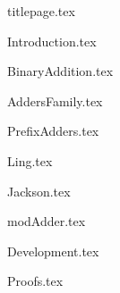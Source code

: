 \documentclass[a4paper,11pt]{article}
\begin{document}
{titlepage.tex}


\tableofcontents
\clearpage

\listoffigures
\listoftables
\clearpage



{Introduction.tex}
\clearpage



{BinaryAddition.tex}
\clearpage



{AddersFamily.tex}
\clearpage



{PrefixAdders.tex}
\clearpage



{Ling.tex}
\clearpage



{Jackson.tex}
\clearpage



{modAdder.tex}
\clearpage




{Development.tex}
\clearpage




{Proofs.tex}
\clearpage






\end{document}
